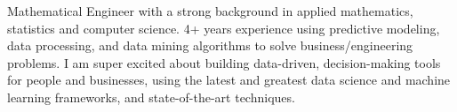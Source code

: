 

\begin{cvparagraph}



Mathematical Engineer with a strong background in applied mathematics, statistics and computer science. 
4+ years experience using predictive modeling, data processing, and data mining algorithms to solve
business/engineering problems. I am super excited about building data-driven, decision-making tools for people
and businesses, using the latest and greatest data science and machine learning frameworks, and state-of-the-art techniques.
\end{cvparagraph}
